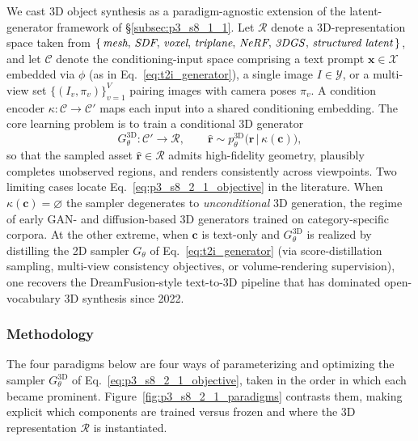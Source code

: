We cast 3D object synthesis as a paradigm-agnostic extension of the latent-generator framework of §\ref{subsec:p3_s8_1_1}.
Let $\mathcal{R}$ denote a 3D-representation space taken from $\{\,\textit{mesh},\,\textit{SDF},\,\textit{voxel},\,\textit{triplane},\,\textit{NeRF},\,\text{\textit{3DGS}},\,\textit{structured latent}\,\}$, and let $\mathcal{C}$ denote the conditioning-input space comprising a text prompt $\mathbf{x}\!\in\!\mathcal{X}$ embedded via $\phi$ (as in Eq.~\eqref{eq:t2i_generator}), a single image $I\!\in\!\mathcal{Y}$, or a multi-view set $\{(I_v,\pi_v)\}_{v=1}^V$ pairing images with camera poses $\pi_v$.
A condition encoder $\kappa:\mathcal{C}\!\to\!\mathcal{C}'$ maps each input into a shared conditioning embedding.
The core learning problem is to train a conditional 3D generator
\begin{equation}
G_\theta^{\text{3D}}:\mathcal{C}'\rightarrow \mathcal{R},\qquad \hat{\mathbf{r}}\sim p_\theta^{\text{3D}}\!\big(\mathbf{r}\,\big|\,\kappa(\mathbf{c})\big),
\label{eq:p3_s8_2_1_objective}
\end{equation}
so that the sampled asset $\hat{\mathbf{r}}\in\mathcal{R}$ admits high-fidelity geometry, plausibly completes unobserved regions, and renders consistently across viewpoints.
Two limiting cases locate Eq.~\eqref{eq:p3_s8_2_1_objective} in the literature.
When $\kappa(\mathbf{c})=\varnothing$ the sampler degenerates to \emph{unconditional} 3D generation, the regime of early GAN- and diffusion-based 3D generators trained on category-specific corpora.
At the other extreme, when $\mathbf{c}$ is text-only and $G_\theta^{\text{3D}}$ is realized by distilling the 2D sampler $G_\theta$ of Eq.~\eqref{eq:t2i_generator} (via score-distillation sampling, multi-view consistency objectives, or volume-rendering supervision), one recovers the DreamFusion-style text-to-3D pipeline that has dominated open-vocabulary 3D synthesis since 2022.


\subsubsection{Methodology}
\label{subsubsec:p3_s8_2_1_methodology}

The four paradigms below are four ways of parameterizing and optimizing the sampler $G_\theta^{\text{3D}}$ of Eq.~\eqref{eq:p3_s8_2_1_objective}, taken in the order in which each became prominent.
Figure~\ref{fig:p3_s8_2_1_paradigms} contrasts them, making explicit which components are trained versus frozen and where the 3D representation $\mathcal{R}$ is instantiated.

